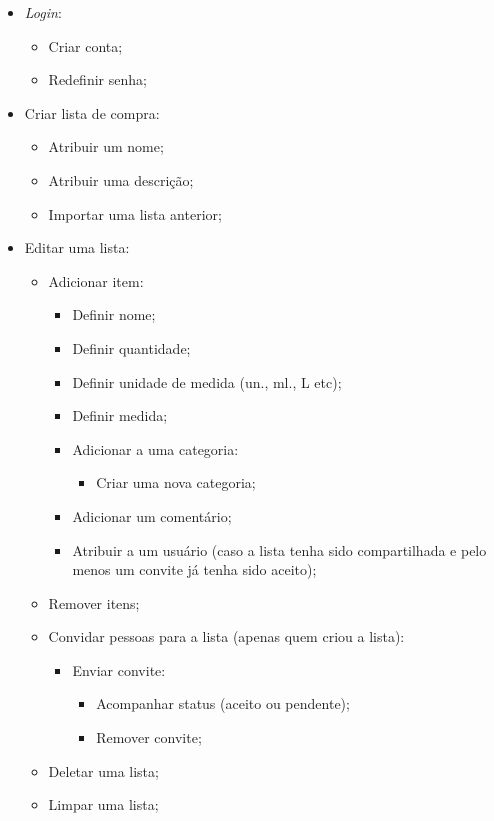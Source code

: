 \begin{itemize}
	\item \textit{Login}:
		\begin{itemize}
			\item Criar conta;
			\item Redefinir senha;
		\end{itemize}
	\item Criar lista de compra:
		\begin{itemize}
			\item Atribuir um nome;
			\item Atribuir uma descrição;
			\item Importar uma lista anterior;
		\end{itemize}
	\item Editar uma lista:
		\begin{itemize}
			\item Adicionar item:
				\begin{itemize}
					\item Definir nome;
					\item Definir quantidade;
					\item Definir unidade de medida (un., ml., L etc);
					\item Definir medida;
					\item Adicionar a uma categoria:
						\begin{itemize}
							\item Criar uma nova categoria;
						\end{itemize}
					\item Adicionar um comentário;
					\item Atribuir a um usuário (caso a lista tenha sido compartilhada e pelo menos um convite já tenha sido aceito);
				\end{itemize}
			\item Remover itens;
			\item Convidar pessoas para a lista (apenas quem criou a lista):
				\begin{itemize}
					\item Enviar convite:
						\begin{itemize}
							\item Acompanhar  status (aceito ou pendente);
							\item Remover convite;
						\end{itemize}
				\end{itemize}
			\item Deletar uma lista;
			\item Limpar uma lista;

\end{itemize}
\end{itemize}
